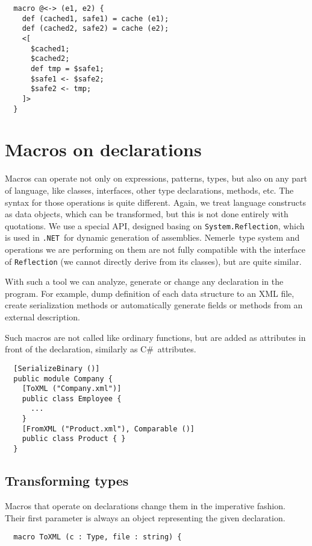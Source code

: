 \documentclass{llncs}
\newcommand{\net}[0]{{\tt .NET}}
\newcommand{\nem}[0]{Nemerle}
\newcommand{\cs}[0]{C\#}
\begin{document}
\begin{verbatim}
  macro @<-> (e1, e2) {
    def (cached1, safe1) = cache (e1);
    def (cached2, safe2) = cache (e2);    
    <[
      $cached1;
      $cached2;
      def tmp = $safe1;
      $safe1 <- $safe2;
      $safe2 <- tmp;
    ]>
  }
\end{verbatim}

\section{Macros on declarations} \label{Declarations}
Macros can operate not only on expressions, patterns, types, but also on
any part of language, like classes, interfaces, other type declarations,
methods, etc. The syntax for those operations is quite different. Again, we
treat language constructs as data objects, which can be transformed, but
this is not done entirely with quotations. We use a special API, designed 
basing on \verb,System.Reflection,, which is used in \net\ for dynamic
generation of assemblies. \nem\ type system and operations we are performing
on them are not fully compatible with the interface of \verb,Reflection, 
(we cannot directly derive from its classes), but are quite similar.

With such a tool we can analyze, generate or change any declaration
in the program. For example, dump definition of each data structure 
to an XML file, create serialization methods or automatically
generate fields or methods from an external description.

Such macros are not called like ordinary functions, but are added as
attributes in front of the declaration, similarly as \cs\ attributes.

\begin{verbatim}
  [SerializeBinary ()] 
  public module Company {
    [ToXML ("Company.xml")] 
    public class Employee {
      ...
    }
    [FromXML ("Product.xml"), Comparable ()] 
    public class Product { }
  }
\end{verbatim}

\subsection{Transforming types}
Macros that operate on declarations change them in the imperative fashion.
Their first parameter is always an object representing the given 
declaration. 

\begin{verbatim}
  macro ToXML (c : Type, file : string) { 
\end{verbatim}
\end{document}
